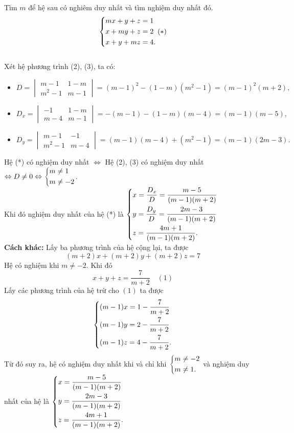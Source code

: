 \begin{bt}%
Tìm $m$ để hệ sau có nghiêm duy nhất và tìm nghiệm duy nhất đó.
$$\left\{\begin{aligned}&mx+y+z=1\\ &x+my+z=2\\ &x+y+mz=4.\end{aligned}\right. (*)$$
\\
Xét hệ phương trình (2), (3), ta có:
\begin{itemize}
\item 
$D=\begin{vmatrix}
m-1 & 1-m\\
m^2-1 & m-1
\end{vmatrix}=(m-1)^2-(1-m)(m^2-1)=(m-1)^2(m+2),$
\item
$D_x=\begin{vmatrix}
-1 & 1-m\\
m-4 & m-1
\end{vmatrix}=-(m-1)-(1-m)(m-4)=(m-1)(m-5),$
\item
$D_y=\begin{vmatrix}
m-1 & -1\\
m^2-1 & m-4
\end{vmatrix}=(m-1)(m-4)+(m^2-1)=(m-1)(2m-3).$
\end{itemize}
Hệ (*) có nghiệm duy nhất $\Leftrightarrow$ Hệ (2), (3) có nghiệm duy nhất $\Leftrightarrow D\neq 0\Leftrightarrow\left\{\begin{aligned}&m\neq 1\\&m\neq -2\end{aligned}\right.$.\\
Khi đó nghiệm duy nhất của hệ (*) là $\left\{\begin{aligned}&x=\dfrac{D_x}{D}=\dfrac{m-5}{(m-1)(m+2)}\\ &y=\dfrac{D_y}{D}=\dfrac{2m-3}{(m-1)(m+2)}\\ &z=\dfrac{4m+1}{(m-1)(m+2)}.\end{aligned}\right.$
\\
\textbf{Cách khác:} Lấy ba phương trình của hệ cộng lại, ta được $$(m+2)x+(m+2)y+(m+2)z=7$$
Hệ có nghiệm khi $m\neq -2$. Khi đó $$x+y+z=\dfrac{7}{m+2} \quad (1)$$
Lấy các phương trình của hệ trừ cho $(1)$ ta được
$$\left\{\begin{aligned}&(m-1)x=1-\dfrac{7}{m+2}\\&(m-1)y=2-\dfrac{7}{m+2}\\&(m-1)z=4-\dfrac{7}{m+2}.\end{aligned}\right.$$
Từ đó suy ra, hệ có nghiệm duy nhất khi và chỉ khi $\left\{\begin{aligned}&m\neq -2\\&m\neq 1.\end{aligned}\right.$ và nghiệm duy nhất của hệ là $\left\{\begin{aligned}&x=\dfrac{m-5}{(m-1)(m+2)}\\ &y=\dfrac{2m-3}{(m-1)(m+2)}\\ &z=\dfrac{4m+1}{(m-1)(m+2)}.\end{aligned}\right.$
\end{bt}


